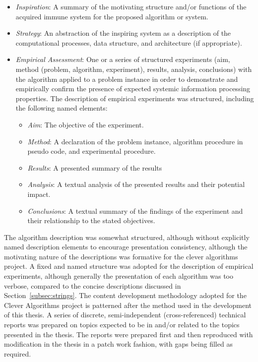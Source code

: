 \documentclass[a4paper, 11pt]{article}
\begin{document}
\begin{itemize}
	\item \emph{Inspiration}: A summary of the motivating structure and/or functions of the acquired immune system for the proposed algorithm or system.
	\item \emph{Strategy}: An abstraction of the inspiring system as a description of the computational processes, data structure, and architecture (if appropriate).
	\item \emph{Empirical Assessment}: One or a series of structured experiments (aim, method (problem, algorithm, experiment), results, analysis, conclusions) with the algorithm applied to a problem instance in order to demonstrate and empirically confirm the presence of expected systemic information processing properties. The description of empirical experiments was structured, including the following named elements:
	\begin{itemize}
		\item \emph{Aim}: The objective of the experiment.
		\item \emph{Method}: A declaration of the problem instance, algorithm procedure in pseudo code, and experimental procedure.
		\item \emph{Results}: A presented summary of the results
		\item \emph{Analysis}: A textual analysis of the presented results and their potential impact.
		\item \emph{Conclusions}: A textual summary of the findings of the experiment and their relationship to the stated objectives.
	\end{itemize}
\end{itemize}

The algorithm description was somewhat structured, although without explicitly named description elements to encourage presentation consistency, although the motivating nature of the descriptions was formative for the clever algorithms project. A fixed and named structure was adopted for the description of empirical experiments, although generally the presentation of each algorithm was too verbose, compared to the concise descriptions discussed in Section~\ref{subsec:strings}.
The content development methodology adopted for the Clever Algorithms project is patterned after the method used in the development of this thesis. A series of discrete, semi-independent (cross-referenced) technical reports was prepared on topics expected to be in and/or related to the topics presented in the thesis. The reports were prepared first and then reproduced with modification in the thesis in a patch work fashion, with gaps being filled as required. 
\end{document}

